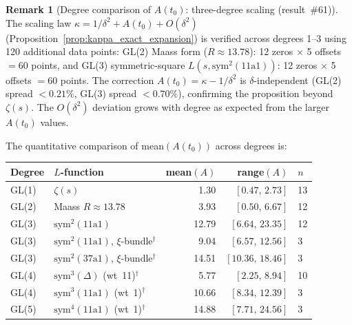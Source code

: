 \documentclass[11pt, a4paper]{article}
\theoremstyle{definition}
\newtheorem{remark}{Remark}[section]
\theoremstyle{plain}
\begin{document}
\begin{remark}[Degree comparison of $A(t_0)$: three-degree scaling (result~\#61)]
\label{rem:kappa_degree_comparison}
The scaling law $\kappa = 1/\delta^2 + A(t_0) + O(\delta^2)$
(Proposition~\ref{prop:kappa_exact_expansion}) is verified across degrees 1--3
using 120 additional data points:
GL(2) Maass form ($R \approx 13.78$): 12 zeros $\times$ 5 offsets $= 60$ points,
and GL(3) symmetric-square $L(s, \mathrm{sym}^2(11\mathrm{a}1))$:
12 zeros $\times$ 5 offsets $= 60$ points.
The correction $A(t_0) = \kappa - 1/\delta^2$ is $\delta$-independent
(GL(2) spread $< 0.21\%$, GL(3) spread $< 0.70\%$),
confirming the proposition beyond $\zeta(s)$.
The $O(\delta^2)$ deviation grows with degree as expected from the larger $A(t_0)$ values.

The quantitative comparison of mean$(A(t_0))$ across degrees is:
\smallskip
\begin{center}
\small
\begin{tabular}{@{}llrrl@{}}
\toprule
Degree & $L$-function & mean$(A)$ & range$(A)$ & $n$ \\
\midrule
GL(1) & $\zeta(s)$ & 1.30 & $[0.47,\, 2.73]$ & 13 \\
GL(2) & Maass $R{\approx}13.78$ & 3.93 & $[0.50,\, 6.67]$ & 12 \\
GL(3) & $\mathrm{sym}^2(11\mathrm{a}1)$ & 12.79 & $[6.64,\, 23.35]$ & 12 \\
GL(3) & $\mathrm{sym}^2(11\mathrm{a}1)$, $\xi$-bundle${}^\dagger$ & 9.04 & $[6.57,\, 12.56]$ & 3 \\
GL(3) & $\mathrm{sym}^2(37\mathrm{a}1)$, $\xi$-bundle${}^\dagger$ & 14.51 & $[10.36,\, 18.46]$ & 3 \\
GL(4) & $\mathrm{sym}^3(\Delta)$ (wt~11)${}^\dagger$ & 5.77 & $[2.25,\, 8.94]$ & 10 \\
GL(4) & $\mathrm{sym}^3(11\mathrm{a}1)$ (wt~1)${}^\dagger$ & 10.66 & $[8.34,\, 12.39]$ & 3 \\
GL(5) & $\mathrm{sym}^4(11\mathrm{a}1)$ (wt~1)${}^\dagger$ & 14.88 & $[7.71,\, 24.56]$ & 3 \\
\bottomrule
\end{tabular}


\end{center}
\end{remark}
\end{document}
